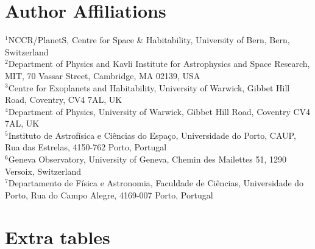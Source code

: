 \documentclass[fleqn,usenatbib]{mnras}
\begin{document}
\section{Author Affiliations}\label{sec:affiliations}
$^{1}$NCCR/PlanetS, Centre for Space \& Habitability, University of Bern, Bern, Switzerland\\
$^{2}$Department of Physics and Kavli Institute for Astrophysics and Space Research, MIT, 70 Vassar Street, Cambridge, MA 02139, USA\\
$^{3}$Centre for Exoplanets and Habitability, University of Warwick, Gibbet Hill Road, Coventry, CV4 7AL, UK\\
$^{4}$Department of Physics, University of Warwick, Gibbet Hill Road, Coventry CV4 7AL, UK \\
$^{5}$Instituto de Astrof\'isica e Ci\^encias do Espa\c{c}o, Universidade do Porto, CAUP, Rua das Estrelas, 4150-762 Porto, Portugal\\
$^{6}$Geneva Observatory, University of Geneva, Chemin des Mailettes 51, 1290 Versoix, Switzerland\\
$^{7}$Departamento de F\'isica e Astronomia, Faculdade de Ci\^{e}ncias, Universidade do Porto, Rua do Campo Alegre, 4169-007 Porto, Portugal\\

\section{Extra tables}
\end{document}
